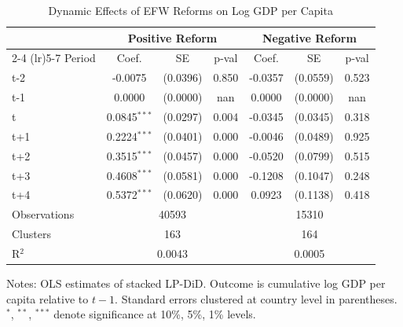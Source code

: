 \begin{table}[htbp]
\centering
\caption{Dynamic Effects of EFW Reforms on Log GDP per Capita}
\label{tab:main_results}
\begin{tabular}{lcccccc}
\hline\hline
& \multicolumn{3}{c}{Positive Reform} & \multicolumn{3}{c}{Negative Reform} \\
\cmidrule(lr){2-4} \cmidrule(lr){5-7}
Period & Coef. & SE & p-val & Coef. & SE & p-val \\
\hline
t-2 & -0.0075 & (0.0396) & 0.850 & -0.0357 & (0.0559) & 0.523 \\
t-1 & 0.0000 & (0.0000) & nan & 0.0000 & (0.0000) & nan \\
t & 0.0845$^{***}$ & (0.0297) & 0.004 & -0.0345 & (0.0345) & 0.318 \\
t+1 & 0.2224$^{***}$ & (0.0401) & 0.000 & -0.0046 & (0.0489) & 0.925 \\
t+2 & 0.3515$^{***}$ & (0.0457) & 0.000 & -0.0520 & (0.0799) & 0.515 \\
t+3 & 0.4608$^{***}$ & (0.0581) & 0.000 & -0.1208 & (0.1047) & 0.248 \\
t+4 & 0.5372$^{***}$ & (0.0620) & 0.000 & 0.0923 & (0.1138) & 0.418 \\
\hline
Observations & \multicolumn{3}{c}{40593} & \multicolumn{3}{c}{15310} \\
Clusters & \multicolumn{3}{c}{163} & \multicolumn{3}{c}{164} \\
R$^2$ & \multicolumn{3}{c}{0.0043} & \multicolumn{3}{c}{0.0005} \\
\hline\hline
\end{tabular}
\begin{tablenotes}[flushleft]
\footnotesize
\item Notes: OLS estimates of stacked LP-DiD. Outcome is cumulative log GDP per capita relative to $t-1$.
Standard errors clustered at country level in parentheses.
$^{*}$, $^{**}$, $^{***}$ denote significance at 10\%, 5\%, 1\% levels.
\end{tablenotes}
\end{table}